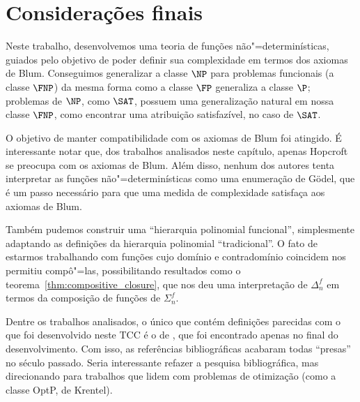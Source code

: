 \section{Considerações finais}

Neste trabalho,
desenvolvemos uma teoria de funções não"=determinísticas,
guiados pelo objetivo de poder definir sua complexidade
em termos dos axiomas de Blum.
Conseguimos generalizar a classe $\NP$ para problemas funcionais
(a classe $\FNP$)
da mesma forma como a classe $\FP$ generaliza a classe $\P$;
problemas de $\NP$,
como $\SAT$,
possuem uma generalização natural em nossa classe $\FNP$,
como encontrar uma atribuição satisfazível, no caso de $\SAT$.

O objetivo de manter compatibilidade com os axiomas de Blum foi atingido.
É interessante notar que, dos trabalhos analisados neste capítulo,
apenas Hopcroft se preocupa com os axiomas de Blum.
Além disso,
nenhum dos autores tenta interpretar as funções não"=determinísticas
como uma enumeração de Gödel,
que é um passo necessário para que uma medida de complexidade
satisfaça aos axiomas de Blum.

Também pudemos construir uma ``hierarquia polinomial funcional'',
simplesmente adaptando as definições da hierarquia polinomial ``tradicional''.
O fato de estarmos trabalhando com funções
cujo domínio e contradomínio coincidem
nos permitiu compô"=las,
possibilitando resultados como o teorema~\ref{thm:compositive_closure},
que nos deu uma interpretação de $\Delta_n^f$
em termos da composição de funções de $\Sigma_n^f$.

Dentre os trabalhos analisados,
o único que contém definições parecidas com o que foi desenvolvido neste TCC
é o de \cite[p.~3]{Krentel1988},
que foi encontrado apenas no final do desenvolvimento.
Com isso,
as referências bibliográficas acabaram todas ``presas''
no século passado.
Seria interessante refazer a pesquisa bibliográfica,
mas direcionando para trabalhos que lidem com problemas de otimização
(como a classe OptP, de Krentel).
